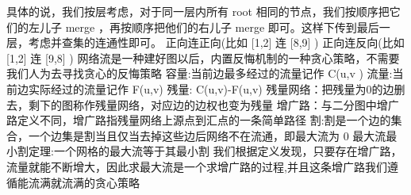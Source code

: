 {}具体的说，我们按层考虑，对于同一层内所有\markdownRendererDollarSign{} root \markdownRendererDollarSign{}相同的节点，我们按顺序把它们的左儿子\markdownRendererDollarSign{} merge \markdownRendererDollarSign{}，再按顺序把他们的右儿子\markdownRendererDollarSign{} merge \markdownRendererDollarSign{}即可。这样下传到最后一层，考虑并查集的连通性即可。\markdownRendererParagraphSeparator
{}正向连正向(比如\markdownRendererDollarSign{} [1,2] \markdownRendererDollarSign{}连\markdownRendererDollarSign{} [8,9] \markdownRendererDollarSign{})\markdownRendererInterblockSeparator
{}\markdownRendererInterblockSeparator
{}正向连反向(比如\markdownRendererDollarSign{} [1,2] \markdownRendererDollarSign{}连\markdownRendererDollarSign{} [9,8] \markdownRendererDollarSign{})\markdownRendererInterblockSeparator
{}\markdownRendererInterblockSeparator
{}
\markdownRendererSectionEnd \markdownRendererSectionBegin
{}\markdownRendererInterblockSeparator
{}\markdownRendererInterblockSeparator
{}
\markdownRendererSectionEnd 
\markdownRendererSectionEnd \markdownRendererSectionBegin
{}\markdownRendererInterblockSeparator
{}网络流是一种建好图以后，内置反悔机制的一种贪心策略，不需要我们人为去寻找贪心的反悔策略\markdownRendererParagraphSeparator
{}容量:当前边最多经过的流量记作\markdownRendererDollarSign{} C(u,v\markdownRendererSoftLineBreak
{}) \markdownRendererDollarSign{}\markdownRendererParagraphSeparator
{}流量:当前边实际经过的流量记作\markdownRendererDollarSign{} F(u,v) \markdownRendererDollarSign{}\markdownRendererParagraphSeparator
{}残量:\markdownRendererDollarSign{} C(u,v)-F(u,v) \markdownRendererDollarSign{}\markdownRendererParagraphSeparator
{}残量网络：把残量为0的边删去，剩下的图称作残量网络，对应边的边权也变为残量\markdownRendererParagraphSeparator
{}增广路：与二分图中增广路定义不同，增广路指残量网络上源点到汇点的一条简单路径\markdownRendererParagraphSeparator
{}割:割是一个边的集合，一个边集是割当且仅当去掉这些边后网络不在流通，即最大流为\markdownRendererDollarSign{} 0 \markdownRendererDollarSign{}\markdownRendererParagraphSeparator
{}最大流最小割定理:一个网格的最大流等于其最小割\markdownRendererParagraphSeparator
{}我们根据定义发现，只要存在增广路，流量就能不断增大，因此求最大流是一个求增广路的过程,并且这条增广路我们遵循能流满就流满的贪心策略\markdownRendererParagraphSeparator
